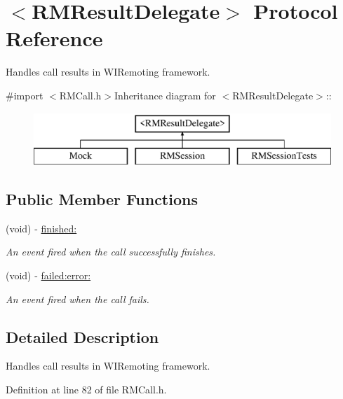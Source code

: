 \hypertarget{protocol_r_m_result_delegate-p}{
\section{$<$RMResultDelegate$>$ Protocol Reference}
\label{protocol_r_m_result_delegate-p}
}


Handles call results in WIRemoting framework.  


{\ttfamily \#import $<$RMCall.h$>$}Inheritance diagram for $<$RMResultDelegate$>$::\begin{figure}[H]
\begin{center}
\leavevmode
\includegraphics[height=2cm]{protocol_r_m_result_delegate-p}
\end{center}
\end{figure}
\subsection*{Public Member Functions}
\begin{DoxyCompactItemize}
\item 
(void) -\/ \hyperlink{protocol_r_m_result_delegate-p_a965fe7cc4e150bb6ecf7cbb02b9c7248}{finished:}
\begin{DoxyCompactList}\small\item\em An event fired when the call successfully finishes. \item\end{DoxyCompactList}\item 
(void) -\/ \hyperlink{protocol_r_m_result_delegate-p_a3521cd9555449b32aabdb759d2dadce5}{failed:error:}
\begin{DoxyCompactList}\small\item\em An event fired when the call fails. \item\end{DoxyCompactList}\end{DoxyCompactItemize}


\subsection{Detailed Description}
Handles call results in WIRemoting framework. 

Definition at line 82 of file RMCall.h.

